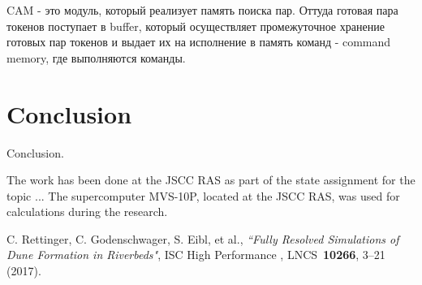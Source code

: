 \documentclass[
11pt,%
tightenlines,%
twoside,%
onecolumn,%
nofloats,%
nobibnotes,%
nofootinbib,%
superscriptaddress,%
noshowpacs,%
centertags]%
{revtex4}
\begin{document}
CAM - это модуль, который реализует память поиска пар. Оттуда готовая пара токенов поступает в buffer, который осуществляет промежуточное хранение готовых пар токенов и выдает их на исполнение в память команд - command memory, где выполняются команды.

\section{Conclusion}

Conclusion.

\begin{acknowledgments}
The work has been done at the JSCC RAS as part of the state assignment for the topic ... The supercomputer MVS-10P, located at the JSCC RAS, was used for calculations during the research.
\end{acknowledgments}

\begin{thebibliography}{99}

C. Rettinger, C. Godenschwager, S. Eibl, et al., {\it ``Fully Resolved Simulations of Dune Formation in Riverbeds"}, ISC High Performance , LNCS~{\bf 10266}, 3--21 (2017).

\end{thebibliography}
\end{document}
